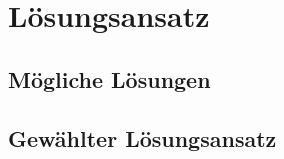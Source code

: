\section{Lösungsansatz}
\label{sec:S4_Lösungsansatz}

\subsection{Mögliche Lösungen}

\subsection{Gewählter Lösungsansatz}
